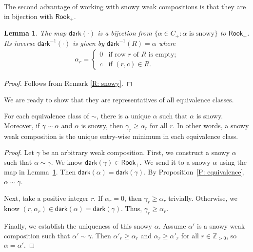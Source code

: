 \documentclass[10pt]{amsart}
\theoremstyle{plain}
\theoremstyle{plain}
\theoremstyle{definition}
\theoremstyle{definition}
\theoremstyle{definition}
\theoremstyle{plain}
\newtheorem{lem}[lem]{Lemma}
\theoremstyle{plain}
\theoremstyle{plain}
\theoremstyle{plain}
\theoremstyle{plain}
\theoremstyle{remark}
\theoremstyle{remark}
\theoremstyle{plain}
\theoremstyle{plain}
\newenvironment{manuallemma}[1]{
  \renewcommand\themanuallemmainner{#1}
  \manuallemmainner
}{\endmanuallemmainner}
\newcommand{\Z}{\mathbb{Z}}
\newcommand{\dark}{\mathsf{dark}}
\newcommand{\Rook}{\mathsf{Rook}}
\begin{document}
The second advantage of working with snowy weak compositions is that
they are in bijection with $\Rook_+$.

\begin{lem}
\label{L: snowy biject rook}
The map $\dark(\cdot)$ is a bijection
from $\{ \alpha \in C_+: \alpha \textrm{ is snowy}\}$
to $\Rook_+$.
Its inverse $\dark^{-1}(\cdot)$ 
is given by $\dark^{-1}(R) = \alpha$
where \begin{align*}
\alpha_r =
\begin{cases}
0 &\text{if row $r$ of $R$ is empty;} \\
c &\text{if $(r,c) \in R$.} 
\end{cases}
\end{align*}
\end{lem}
\begin{proof}
Follows from Remark \ref{R: snowy}.
\end{proof}

We are ready to show that they are representatives of all equivalence classes.

\begin{manuallemma}{\ref{L: snowy weak composition in equivalence class}}
For each equivalence class of $\sim$, 
there is a unique $\alpha$ such that $\alpha$ is snowy. 
Moreover, if $\gamma \sim \alpha$ and $\alpha$ is snowy, 
then $\gamma_r \geqslant \alpha_r$ for all $r$.
In other words, a snowy weak composition is the
unique entry-wise minimum in each equivalence class. 
\end{manuallemma}
\begin{proof}
Let $\gamma$ be an arbitrary weak composition. 
First, we construct a snowy $\alpha$ 
such that $\alpha \sim \gamma$.
We know $\dark(\gamma) \in \Rook_+$.
We send it to a snowy $\alpha$
using the map in Lemma~\ref{L: snowy biject rook}.
Then $\dark(\alpha) = \dark(\gamma)$.
By Proposition~\ref{P: equivalence},
$\alpha \sim \gamma$.

Next, take a positive integer $r$.
If $\alpha_r = 0$, then $\gamma_r \geqslant \alpha_r$ trivially.
Otherwise, we know $(r, \alpha_r) \in \dark(\alpha) = \dark(\gamma)$.
Thus, $\gamma_r \geqslant \alpha_r$.

Finally, we establish the uniqueness of this snowy $\alpha$.
Assume $\alpha'$ is a snowy weak composition
such that $\alpha' \sim \gamma$.
Then $\alpha'_r \geqslant \alpha_r$ and $\alpha_r \geqslant \alpha'_r$
for all $r \in \Z_{>0}$, so $\alpha = \alpha'$.
\end{proof}
\end{document}
